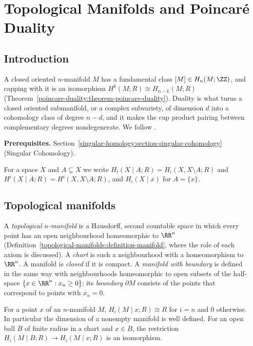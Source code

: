 \chapter{Topological Manifolds and Poincar\'e Duality}\label{poincare-duality}

\section{Introduction}\label{poincare-duality:section-introduction}

A closed oriented $n$-manifold $M$ has a fundamental class $[M] \in H_n(M; \ZZ)$, and capping with it is an isomorphism
$H^k(M; R) \cong H_{n-k}(M; R)$ (Theorem~\ref{poincare-duality:theorem-poincare-duality}). Duality is what turns a closed
oriented submanifold, or a complex subvariety, of dimension $d$ into a cohomology class of degree $n - d$, and it makes the cup
product pairing between complementary degrees nondegenerate. We follow \cite[Section 3.3]{hatcher-at}.

\noindent\textbf{Prerequisites.} Section~\ref{singular-homology:section-singular-cohomology} (Singular Cohomology).

For a space $X$ and $A \subseteq X$ we write $H_i(X \mid A; R) = H_i(X, X \setminus A; R)$ and $H^i(X \mid A; R) = H^i(X, X \setminus A; R)$, and
$H_i(X \mid x)$ for $A = \{x\}$.

\section{Topological manifolds}\label{poincare-duality:section-manifolds}

\begin{definition}\label{poincare-duality:definition-manifold}
A \emph{topological $n$-manifold} is a Hausdorff, second countable space in which every point has an open neighbourhood homeomorphic to $\RR^n$
(Definition~\ref{topological-manifolds:definition-manifold}, where the role of each axiom is discussed). A
\emph{chart} is such a neighbourhood with a homeomorphism to $\RR^n$. A manifold is \emph{closed} if it is compact. A \emph{manifold with boundary} is defined
in the same way with neighbourhoods homeomorphic to open subsets of the half-space $\{x \in \RR^n : x_n \geq 0\}$; its \emph{boundary} $\partial M$ consists of the
points that correspond to points with $x_n = 0$.
\end{definition}

\begin{lemma}\label{poincare-duality:lemma-local-homology}
For a point $x$ of an $n$-manifold $M$, $H_i(M \mid x; R) \cong R$ for $i = n$ and $0$ otherwise. In particular the dimension of a nonempty manifold is well
defined. For an open ball $B$ of finite radius in a chart and $x \in B$, the restriction $H_i(M \mid B; R) \to H_i(M \mid x; R)$ is an isomorphism.
\end{lemma}

